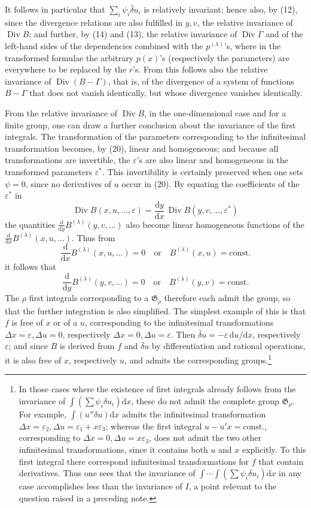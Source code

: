 \documentclass[11pt]{article}
\newcommand{\D}{\Delta}
\providecommand{\eps}{\varepsilon}
\providecommand{\dd}{\mathrm d}
\providecommand{\Div}{\operatorname{Div}}
\providecommand{\G}{\mathfrak G}
\providecommand{\bd}{\bar{\delta}}
\providecommand{\dd}{\mathrm d}
\begin{document}
It follows in particular that \(\sum_i\psi_i\bd u_i\) is relatively invariant; hence also, by (12), since the divergence relations are also fulfilled in \(y,v\), the relative invariance of \(\Div B\); and further, by (14) and (13), the relative invariance of \(\Div\Gamma\) and of the left-hand sides of the dependencies combined with the \(p^{(\lambda)}\)'s, where in the transformed formulae the arbitrary \(p(x)\)'s (respectively the parameters) are everywhere to be replaced by the \(r\)'s. From this follows also the relative invariance of \(\Div(B-\Gamma)\), that is, of the divergence of a system of functions \(B-\Gamma\) that does not vanish identically, but whose divergence vanishes identically.

From the relative invariance of \(\Div B\), in the one-dimensional case and for a finite group, one can draw a further conclusion about the invariance of the first integrals. The transformation of the parameters corresponding to the infinitesimal transformation becomes, by (20), linear and homogeneous; and because all transformations are invertible, the \(\eps\)'s are also linear and homogeneous in the transformed parameters \(\eps^*\). This invertibility is certainly preserved when one sets \(\psi=0\), since no derivatives of \(u\) occur in (20). By equating the coefficients of the \(\eps^*\) in
\[
\Div B(x,u,\ldots,\eps)=\frac{\dd y}{\dd x}\,\Div B(y,v,\ldots,\eps^*)
\]
the quantities \(\frac{\dd}{\dd y}B^{(\lambda)}(y,v,\ldots)\) also become linear homogeneous functions of the \(\frac{\dd}{\dd x}B^{(\lambda)}(x,u,\ldots)\). Thus from
\[
\frac{\dd}{\dd x}B^{(\lambda)}(x,u,\ldots)=0
\quad\text{or}\quad B^{(\lambda)}(x,u)=\mathrm{const.}
\]
it follows that
\[
\frac{\dd}{\dd y}B^{(\lambda)}(y,v,\ldots)=0
\quad\text{or}\quad B^{(\lambda)}(y,v)=\mathrm{const.}
\]
The \(\rho\) first integrals corresponding to a \(\G_\rho\) therefore each admit the group, so that the further integration is also simplified. The simplest example of this is that \(f\) is free of \(x\) or of a \(u\), corresponding to the infinitesimal transformations \(\D x=\eps,\D u=0\), respectively \(\D x=0,\D u=\eps\). Then \(\bd u=-\eps\,\dd u/\dd x\), respectively \(\eps\); and since \(B\) is derived from \(f\) and \(\bd u\) by differentiation and rational operations, it is also free of \(x\), respectively \(u\), and admits the corresponding groups.\footnote{In those cases where the existence of first integrals already follows from the invariance of \(\int(\sum\psi_i\delta u_i)\dd x\), these do not admit the complete group \(\G_\rho\). For example, \(\int(u''\delta u)\dd x\) admits the infinitesimal transformation \(\D x=\eps_2,\D u=\eps_1+x\eps_3\); whereas the first integral \(u-u'x=\mathrm{const.}\), corresponding to \(\D x=0,\D u=x\eps_3\), does not admit the two other infinitesimal transformations, since it contains both \(u\) and \(x\) explicitly. To this first integral there correspond infinitesimal transformations for \(f\) that contain derivatives. Thus one sees that the invariance of \(\int\!\cdots\!\int(\sum\psi_i\delta u_i)\dd x\) in any case accomplishes less than the invariance of \(I\), a point relevant to the question raised in a preceding note.}
\end{document}
